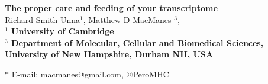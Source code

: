 \begin{flushleft}
{\Large
\textbf{The proper care and feeding of your transcriptome}
} \\

Richard Smith-Unna$^{1}$, 
Matthew D MacManes $^{3}$, 
\\


\bf{$^{1}$} University of Cambridge \\
\bf{$^{3}$} Department of Molecular, Cellular and Biomedical Sciences, University of New Hampshire, Durham NH, USA


$\ast$ E-mail: macmanes@gmail.com, @PeroMHC
\end{flushleft}
